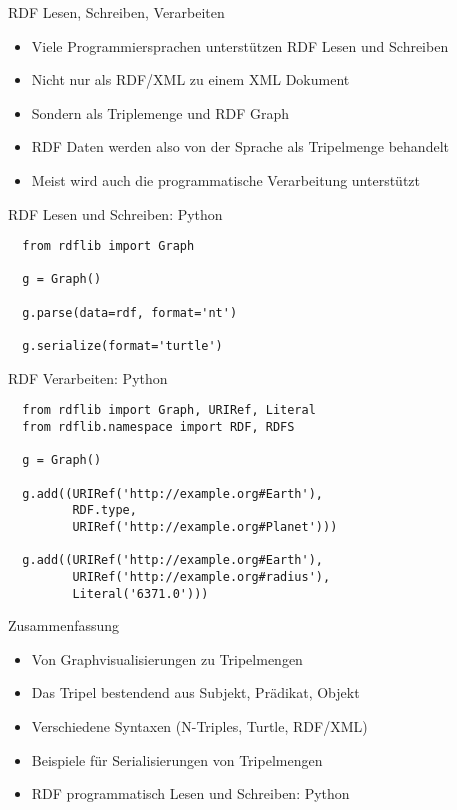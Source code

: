 \documentclass{beamer}
\begin{document}
\begin{frame}{RDF Lesen, Schreiben, Verarbeiten}
	
	\begin{itemize}
		\item Viele Programmiersprachen unterstützen RDF Lesen und Schreiben
		\item Nicht nur als RDF/XML zu einem XML Dokument
		\item Sondern als Triplemenge und RDF Graph
		\item RDF Daten werden also von der Sprache als Tripelmenge behandelt
		\item Meist wird auch die programmatische Verarbeitung unterstützt
	\end{itemize}
	
\end{frame}

\begin{frame}[fragile]{RDF Lesen und Schreiben: Python}
	
	\begin{lstlisting}
  from rdflib import Graph	
  
  g = Graph()
  
  g.parse(data=rdf, format='nt')
  
  g.serialize(format='turtle')
	\end{lstlisting}
	
\end{frame}

\begin{frame}[fragile]{RDF Verarbeiten: Python}
	
	\begin{lstlisting}
  from rdflib import Graph, URIRef, Literal
  from rdflib.namespace import RDF, RDFS
  
  g = Graph()
  
  g.add((URIRef('http://example.org#Earth'), 
         RDF.type, 
         URIRef('http://example.org#Planet')))
        
  g.add((URIRef('http://example.org#Earth'), 
         URIRef('http://example.org#radius'), 
         Literal('6371.0')))

	\end{lstlisting}
	
\end{frame}

\begin{frame}{Zusammenfassung}
	
	\begin{itemize}
		\item Von Graphvisualisierungen zu Tripelmengen
		\item Das Tripel bestendend aus Subjekt, Prädikat, Objekt
		\item Verschiedene Syntaxen (N-Triples, Turtle, RDF/XML)
		\item Beispiele für Serialisierungen von Tripelmengen
		\item RDF programmatisch Lesen und Schreiben: Python
	\end{itemize}
	
\end{frame}
\end{document}

